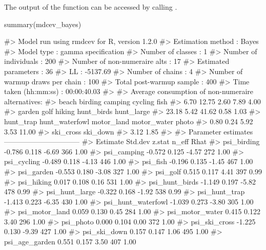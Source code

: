 The output of the function can be accessed by calling .

\begin{Schunk}
\begin{Sinput}
    summary(mdcev_bayes)
\end{Sinput}
\begin{Soutput}
#> Model run using rmdcev for R, version 1.2.0 
#> Estimation method                : Bayes
#> Model type                       : gamma specification
#> Number of classes                : 1
#> Number of individuals            : 200
#> Number of non-numeraire alts     : 17
#> Estimated parameters             : 36
#> LL                               : -5137.69
#> Number of chains                 : 4
#> Number of warmup draws per chain : 100
#> Total post-warmup sample         : 400
#> Time taken (hh:mm:ss)            : 00:00:40.03
#> 
#> Average consumption of non-numeraire alternatives:
#>          beach        birding        camping        cycling           fish 
#>           6.70          12.75           2.60           7.89           4.00 
#>         garden           golf         hiking     hunt_birds     hunt_large 
#>          23.18           5.42          41.62           0.58           1.03 
#>      hunt_trap hunt_waterfowl     motor_land    motor_water          photo 
#>           0.80           0.24           5.92           3.53          11.00 
#>      ski_cross       ski_down 
#>           3.12           1.85 
#> 
#> Parameter estimates --------------------------------  
#>                      Estimate Std.dev z.stat n_eff Rhat
#> psi_birding            -0.786   0.118  -6.69   366 1.00
#> psi_camping            -0.572   0.125  -4.57   272 1.00
#> psi_cycling            -0.489   0.118  -4.13   446 1.00
#> psi_fish               -0.196   0.135  -1.45   467 1.00
#> psi_garden             -0.553   0.180  -3.08   327 1.00
#> psi_golf                0.515   0.117   4.41   397 0.99
#> psi_hiking              0.017   0.108   0.16   531 1.00
#> psi_hunt_birds         -1.149   0.197  -5.82   478 0.99
#> psi_hunt_large         -0.322   0.168  -1.92   538 0.99
#> psi_hunt_trap          -1.413   0.223  -6.35   430 1.00
#> psi_hunt_waterfowl     -1.039   0.273  -3.80   305 1.00
#> psi_motor_land          0.059   0.130   0.45   284 1.00
#> psi_motor_water         0.415   0.122   3.40   296 1.00
#> psi_photo               0.000   0.104   0.00   372 1.00
#> psi_ski_cross          -1.225   0.130  -9.39   427 1.00
#> psi_ski_down            0.157   0.147   1.06   495 1.00
#> psi_age_garden          0.551   0.157   3.50   407 1.00

\end{Soutput}
\end{Schunk}
